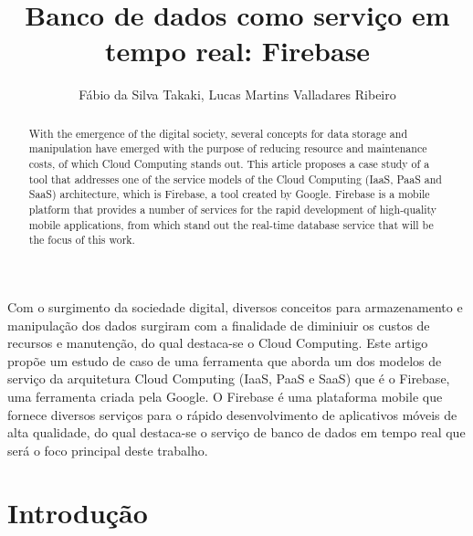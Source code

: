 \documentclass[12pt]{article}
\title{Banco de dados como serviço em tempo real: Firebase}
\author{Fábio da Silva Takaki\inst{1}, Lucas Martins Valladares Ribeiro\inst{1} }
\begin{document}
 

\maketitle

\begin{abstract}
   With the emergence of the digital society, several concepts for data storage and manipulation have emerged with the purpose of reducing resource and maintenance costs, of which Cloud Computing stands out. This article proposes a case study of a tool that addresses one of the service models of the Cloud Computing (IaaS, PaaS and SaaS) architecture, which is Firebase, a tool created by Google. Firebase is a mobile platform that provides a number of services for the rapid development of high-quality mobile applications, from which stand out the real-time database service that will be the focus of this work.
\end{abstract}
     
\begin{resumo} 
   Com o surgimento da sociedade digital, diversos conceitos para armazenamento e manipulação dos dados surgiram com a finalidade de diminiuir os custos de recursos e manutenção, do qual destaca-se o Cloud Computing. Este artigo propõe um estudo de caso de uma ferramenta que aborda um dos modelos de serviço da arquitetura Cloud Computing (IaaS, PaaS e SaaS) que é o Firebase, uma ferramenta criada pela Google. O Firebase é uma plataforma mobile que fornece diversos serviços para o rápido desenvolvimento de aplicativos móveis de alta qualidade, do qual destaca-se o serviço de banco de dados em tempo real que será o foco principal deste trabalho.
\end{resumo}


\section{Introdução}
\end{document}
